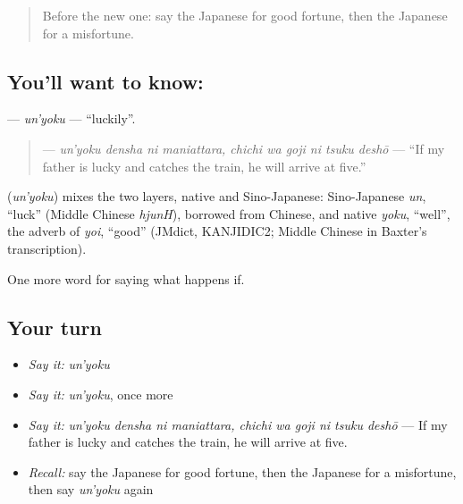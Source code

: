 \label{lesson:JA-C508-un-yoku}



\begin{quote}
Before the new one: say the Japanese for good fortune, then the Japanese for a misfortune.
\end{quote}

\subsection*{You'll want to know: }
\textbf{} — \emph{un'yoku} — \textquotedblleft{}luckily\textquotedblright{}.

\begin{quote}
\textbf{    } — \emph{un'yoku densha ni maniattara, chichi wa goji ni tsuku deshō} — \textquotedblleft{}If my father is lucky and catches the train, he will arrive at five.\textquotedblright{}
\end{quote}

\begin{cousinweb}
\textbf{} (\emph{un'yoku}) mixes the two layers, native and Sino-Japanese: Sino-Japanese \emph{un}, \textquotedblleft{}luck\textquotedblright{} (Middle Chinese \emph{hjunH}), borrowed from Chinese, and native \emph{yoku}, \textquotedblleft{}well\textquotedblright{}, the adverb of \emph{yoi}, \textquotedblleft{}good\textquotedblright{} (JMdict, KANJIDIC2; Middle Chinese in Baxter's transcription).
\end{cousinweb}

\begin{grammarlens}[title={What you've built}]
One more word for saying what happens if.
\end{grammarlens}

\subsection*{Your turn}
\begin{itemize}
\raggedright
  \item \emph{Say it:} \emph{un'yoku}
  \item \emph{Say it:} \emph{un'yoku}, once more
  \item \emph{Say it:} \emph{un'yoku densha ni maniattara, chichi wa goji ni tsuku deshō} — If my father is lucky and catches the train, he will arrive at five.
  \item \emph{Recall:} say the Japanese for good fortune, then the Japanese for a misfortune, then say \emph{un'yoku} again
\end{itemize}

